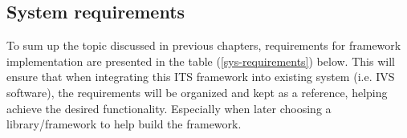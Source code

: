 \documentclass[main.tex]{subfiles}
\begin{document}


\subsection{System requirements}

To sum up the topic discussed in previous chapters, requirements for framework implementation
are presented in the table (\ref{sys-requirements}) below. This will ensure that when
integrating this ITS framework into existing system (i.e. IVS software), the requirements will
be organized and kept as a reference, helping achieve the desired functionality. Especially
when later choosing a library/framework to help build the framework. 
\end{document}
